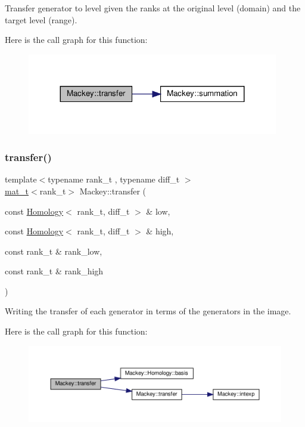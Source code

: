 Transfer generator to level given the ranks at the original level (domain) and the target level (range). 

Here is the call graph for this function\+:\nopagebreak
\begin{figure}[H]
\begin{center}
\leavevmode
\includegraphics[width=311pt]{namespaceMackey_a0550bf97e47b3c319cb5e1bd81008d89_cgraph}
\end{center}
\end{figure}
\mbox{\label{namespaceMackey_abd5b370902e8b53b32e3fd4e329f068d}} 
\subsubsection{\texorpdfstring{transfer()}{transfer()}\hspace{0.1cm}{\footnotesize\ttfamily [6/6]}}
{\footnotesize\ttfamily template$<$typename rank\+\_\+t , typename diff\+\_\+t $>$ \\
\hyperlink{namespaceMackey_a035386035757dade630f685e508e5cf9}{mat\+\_\+t}$<$rank\+\_\+t$>$ Mackey\+::transfer (\begin{DoxyParamCaption}\item[{const \hyperlink{classMackey_1_1Homology}{Homology}$<$ rank\+\_\+t, diff\+\_\+t $>$ \&}]{low,  }\item[{const \hyperlink{classMackey_1_1Homology}{Homology}$<$ rank\+\_\+t, diff\+\_\+t $>$ \&}]{high,  }\item[{const rank\+\_\+t \&}]{rank\+\_\+low,  }\item[{const rank\+\_\+t \&}]{rank\+\_\+high }\end{DoxyParamCaption})}



Writing the transfer of each generator in terms of the generators in the image. 

Here is the call graph for this function\+:\nopagebreak
\begin{figure}[H]
\begin{center}
\leavevmode
\includegraphics[width=350pt]{namespaceMackey_abd5b370902e8b53b32e3fd4e329f068d_cgraph}
\end{center}
\end{figure}


